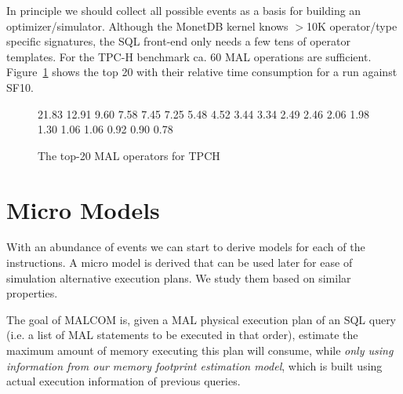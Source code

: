 \documentclass[conference]{IEEEtran}
\begin{document}
In principle we should collect all possible events as a basis for building an optimizer/simulator.
Although the MonetDB kernel knows $>$10K operator/type specific signatures, the SQL front-end only needs a few tens of operator templates.
For the TPC-H benchmark ca. 60 MAL operations are sufficient.
Figure~\ref{fig:tpch_instructions} shows the top 20 with their relative time consumption for a run against SF10.

\begin{figure}
\begin{verb} 
21.83 %
12.91 %
 9.60 %
 7.58 %
 7.45 %
 7.25 %
 5.48 %
 4.52 %
 3.44 %
 3.34 %
 2.49 %
 2.46 %
 2.06 %
 1.98 %
 1.30 %
 1.06 %
 1.06 %
 0.92 %
 0.90 %
 0.78 %
\end{verb}
\caption{The top-20 MAL operators for TPCH}
\label{fig:tpch_instructions}
\end{figure}

\section{Micro Models}
With an abundance of events we can start to derive models for each of the instructions.
A micro model is derived that can be used later for ease of simulation alternative execution plans.
We study them based on similar properties.

The goal of MALCOM is, given a MAL physical execution plan of an SQL query (i.e. a list of MAL statements to be executed in that order), estimate the maximum amount of memory executing this plan will consume, while \textit{only using information from our memory footprint estimation model}, which is built using actual execution information of previous queries.
\end{document}
